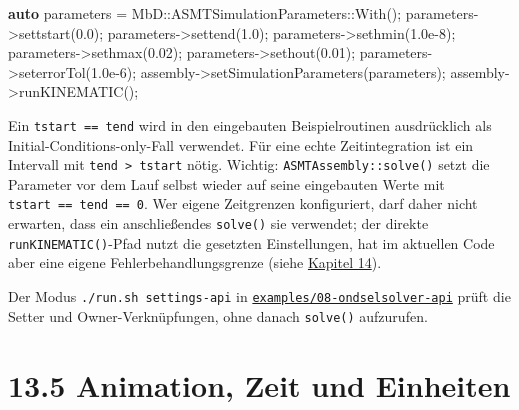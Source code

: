 \documentclass[
  12pt
]{book}
\newenvironment{Shaded}{}{}
\newcommand{\FloatTok}[1]{\textcolor[rgb]{0.25,0.63,0.44}{#1}}
\newcommand{\KeywordTok}[1]{\textcolor[rgb]{0.00,0.44,0.13}{\textbf{#1}}}
\newcommand{\NormalTok}[1]{#1}
\newcommand{\OperatorTok}[1]{\textcolor[rgb]{0.40,0.40,0.40}{#1}}
\begin{document}
\begin{Shaded}
\begin{Highlighting}[]
\KeywordTok{auto}\NormalTok{ parameters }\OperatorTok{=}\NormalTok{ MbD}\OperatorTok{::}\NormalTok{ASMTSimulationParameters}\OperatorTok{::}\NormalTok{With}\OperatorTok{();}
\NormalTok{parameters}\OperatorTok{{-}\textgreater{}}\NormalTok{settstart}\OperatorTok{(}\FloatTok{0.0}\OperatorTok{);}
\NormalTok{parameters}\OperatorTok{{-}\textgreater{}}\NormalTok{settend}\OperatorTok{(}\FloatTok{1.0}\OperatorTok{);}
\NormalTok{parameters}\OperatorTok{{-}\textgreater{}}\NormalTok{sethmin}\OperatorTok{(}\FloatTok{1.0e{-}8}\OperatorTok{);}
\NormalTok{parameters}\OperatorTok{{-}\textgreater{}}\NormalTok{sethmax}\OperatorTok{(}\FloatTok{0.02}\OperatorTok{);}
\NormalTok{parameters}\OperatorTok{{-}\textgreater{}}\NormalTok{sethout}\OperatorTok{(}\FloatTok{0.01}\OperatorTok{);}
\NormalTok{parameters}\OperatorTok{{-}\textgreater{}}\NormalTok{seterrorTol}\OperatorTok{(}\FloatTok{1.0e{-}6}\OperatorTok{);}
\NormalTok{assembly}\OperatorTok{{-}\textgreater{}}\NormalTok{setSimulationParameters}\OperatorTok{(}\NormalTok{parameters}\OperatorTok{);}
\NormalTok{assembly}\OperatorTok{{-}\textgreater{}}\NormalTok{runKINEMATIC}\OperatorTok{();}
\end{Highlighting}
\end{Shaded}

Ein \texttt{tstart\ ==\ tend} wird in den eingebauten Beispielroutinen
ausdrücklich als Initial-Conditions-only-Fall verwendet. Für eine echte
Zeitintegration ist ein Intervall mit
\texttt{tend\ \textgreater{}\ tstart} nötig. Wichtig:
\texttt{ASMTAssembly::solve()} setzt die Parameter vor dem Lauf selbst
wieder auf seine eingebauten Werte mit \texttt{tstart\ ==\ tend\ ==\ 0}.
Wer eigene Zeitgrenzen konfiguriert, darf daher nicht erwarten, dass ein
anschließendes \texttt{solve()} sie verwendet; der direkte
\texttt{runKINEMATIC()}-Pfad nutzt die gesetzten Einstellungen, hat im
aktuellen Code aber eine eigene Fehlerbehandlungsgrenze (siehe
\protect\hyperlink{kap-solve-ergebnisse}{Kapitel 14}).

Der Modus \texttt{./run.sh\ settings-api} in
\href{./examples/08-ondselsolver-api/README.md}{\texttt{examples/08-ondselsolver-api}}
prüft die Setter und Owner-Verknüpfungen, ohne danach \texttt{solve()}
aufzurufen.

\hypertarget{animation-zeit-und-einheiten}{%
\section{\texorpdfstring{{13.5} Animation, Zeit und
Einheiten}{13.5 Animation, Zeit und Einheiten}}\label{animation-zeit-und-einheiten}}
\end{document}

